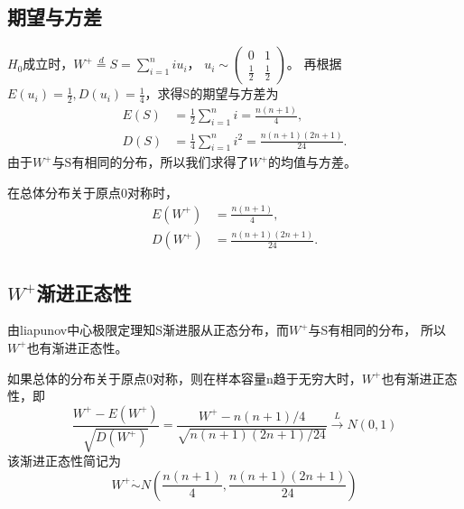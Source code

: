 \documentclass[lang=cn,10pt]{elegantbook}
\begin{document}
\subsection{期望与方差}
$H_0$成立时，$W^+\overset{d}{\operatorname*{=}}S=\sum_{i=1}^{n}iu_i$，
$u_i\sim\begin{pmatrix}
        0       & 1       \\
        \frac12 & \frac12
    \end{pmatrix}$。
再根据$E(u_i)=\frac12,D(u_i)=\frac14$，求得S的期望与方差为
\begin{equation}
    \begin{aligned}
        E(S) & =\frac12\sum_{i=1}^ni=\frac{n\left(n+1\right)}4,                       \\
        D(S) & =\frac14\sum_{i=1}^ni^2=\frac{n\left(n+1\right)\left(2n+1\right)}{24}.
    \end{aligned}
\end{equation}
由于$W^+$与S有相同的分布，所以我们求得了$W^+$的均值与方差。
\begin{proposition}
    在总体分布关于原点0对称时，
    \begin{equation}
        \begin{aligned}
            E(W^+) & =\frac{n\left(n+1\right)}4,                     \\
            D(W^+) & =\frac{n\left(n+1\right)\left(2n+1\right)}{24}.
        \end{aligned}
    \end{equation}
\end{proposition}

\subsection{$W^+$渐进正态性}
由liapunov中心极限定理知S渐进服从正态分布，而$W^+$与S有相同的分布，
所以$W^+$也有渐进正态性。

\begin{proposition}
    如果总体的分布关于原点0对称，则在样本容量n趋于无穷大时，$W^+$也有渐进正态性，即
    \begin{equation}
        \frac{W^+-E\left(W^+\right)}{\sqrt{D\left(W^+\right)}}
        =\frac{W^+-n\left(n+1\right)/4}{\sqrt{n\left(n+1\right)\left(2n+1\right)/24}}
        \xrightarrow{L}N(0,1)
    \end{equation}
    该渐进正态性简记为
    \begin{equation}
        W^+\dot{\sim}N(\frac{n(n+1)}{4},\frac{n(n+1)(2n+1)}{24})
    \end{equation}
\end{proposition}
\end{document}
